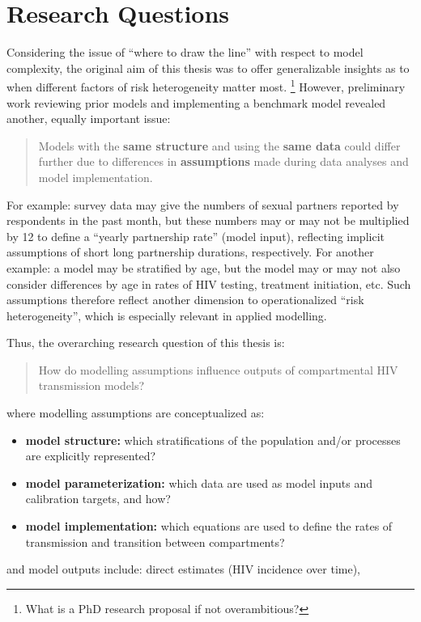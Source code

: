 \section{Research Questions}\label{intro.rqs}
Considering the issue of ``where to draw the line'' with respect to model complexity,
the original aim of this thesis was to offer generalizable insights as to
when different factors of risk heterogeneity matter most.%
\footnote{What is a PhD research proposal if not overambitious?}
However, preliminary work reviewing prior models and implementing a benchmark model
revealed another, equally important issue:
\begin{quote}
  Models with the \textbf{same structure} and using the \textbf{same data}
  could differ further due to differences in
  \textbf{assumptions} made during data analyses and model implementation.
\end{quote}
For example:
survey data may give the numbers of sexual partners reported by respondents in the past month,
but these numbers may or may not be multiplied by 12
to define a ``yearly partnership rate'' (model input),
reflecting implicit assumptions of short \vs long partnership durations, respectively.
For another example:
a model may be stratified by age, but the model may or may not also consider
differences by age in rates of HIV testing, treatment initiation, etc.
Such assumptions therefore reflect another dimension to operationalized ``risk heterogeneity'',
which is especially relevant in applied modelling.
\par
\pagebreak %
Thus, the overarching research question of this thesis is:
\begin{quote}
  How do modelling assumptions influence outputs of compartmental HIV transmission models?
\end{quote}
where modelling assumptions are conceptualized as:
\begin{itemize}
  \item \textbf{model structure:} which
  stratifications of the population and/or processes are explicitly represented?
  \item \textbf{model parameterization:} which
  data are used as model inputs and calibration targets, and how?
  \item \textbf{model implementation:} which
  equations are used to define the rates of transmission and transition between compartments?
\end{itemize}
and model outputs include:
direct estimates (\eg HIV incidence over time),
